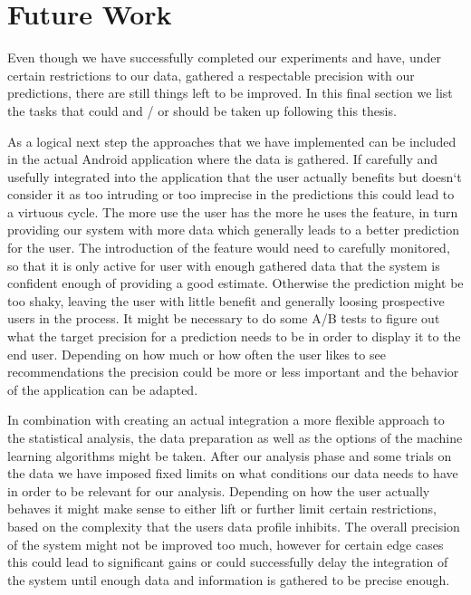 \newpage
\chapter{Future Work}
\label{cha:future_work}

Even though we have successfully completed our experiments and have, under certain restrictions to our data, gathered a respectable precision with our predictions, there are still things left to be improved. In this final section we list the tasks that could and / or should be taken up following this thesis.

As a logical next step the approaches that we have implemented can be included in the actual Android application where the data is gathered. If carefully and usefully integrated into the application that the user actually benefits but doesn`t consider it as too intruding or too imprecise in the predictions this could lead to a virtuous cycle. The more use the user has the more he uses the feature, in turn providing our system with more data which generally leads to a better prediction for the user. The introduction of the feature would need to carefully monitored, so that it is only active for user with enough gathered data that the system is confident enough of providing a good estimate. Otherwise the prediction might be too shaky, leaving the user with little benefit and generally loosing prospective users in the process. It might be necessary to do some A/B tests to figure out what the target precision for a prediction needs to be in order to display it to the end user. Depending on how much or how often the user likes to see recommendations the precision could be more or less important and the behavior of the application can be adapted.

In combination with creating an actual integration a more flexible approach to the statistical analysis, the data preparation as well as the options of the machine learning algorithms might be taken. After our analysis phase and some trials on the data we have imposed fixed limits on what conditions our data needs to have in order to be relevant for our analysis. Depending on how the user actually behaves it might make sense to either lift or  further limit certain restrictions, based on the complexity that the users data profile inhibits. The overall precision of the system might not be improved too much, however for certain edge cases this could lead to significant gains or could successfully delay the integration of the system until enough data and information is gathered to be precise enough. 

